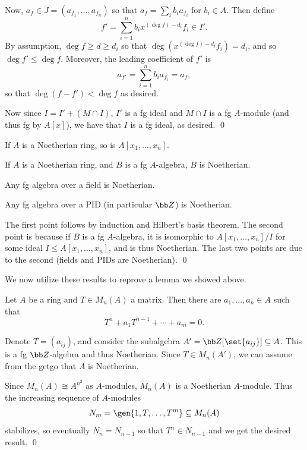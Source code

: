     Now, $a_f\in J=(a_{f_1},\dots,a_{f_n})$ so that $a_f=\sum_ib_ia_{f_i}$ for $b_i\in A$.
    Then define
    $$ f' = \sum_{i=1}^n b_ix^{(\deg f)-d_i}f_i \in I' . $$
    By assumption, $\deg f\geq d\geq d_i$ so that $\deg(x^{(\deg f)-d_i}f_i)=d_i$, and so $\deg f'\leq\deg f$.
    Moreover, the leading coefficient of $f'$ is
    $$ a_{f'} = \sum_{i=1}^n b_ia_{f_i} = a_f, $$
    so that $\deg(f-f')<\deg f$ as desired.

    Now since $I=I'+(M\cap I)$, $I'$ is a fg ideal and $M\cap I$ is a fg $A$-module (and thus fg by $A[x]$), we have that $I$ is a fg ideal, as desired.
    \qed

\eproof

\bcoro

    \benum
        \item If $A$ is a Noetherian ring, so is $A[x_1,\dots,x_n]$.
        \item If $A$ is a Noetherian ring, and $B$ is a fg $A$-algebra, $B$ is Noetherian.
        \item Any fg algebra over a field is Noetherian.
        \item Any fg algebra over a PID (in particular $\bZ$) is Noetherian.
    \eenum

\ecoro

\bproof

    The first point follows by induction and Hilbert's basis theorem.
    The second point is because if $B$ is a fg $A$-algebra, it is isomorphic to $A[x_1,\dots,x_n]/I$ for some ideal $I\leq A[x_1,\dots,x_n]$, and is thus Noetherian.
    The last two points are due to the second (fields and PIDs are Noetherian).
    \qed

\eproof

We now utilize these results to reprove a lemma we showed above.

\blemm

    Let $A$ be a ring and $T\in M_n(A)$ a matrix.
    Then there are $a_1,\dots,a_n\in A$ such that
    $$ T^n + a_1T^{n-1} + \cdots + a_m = 0 . $$

\elemm

\bproof

    Denote $T=(a_{ij})$, and consider the subalgebra $A'=\bZ[\set{a_{ij}}]\subseteq A$.
    This is a fg $\bZ$-algebra and thus Noetherian.
    Since $T\in M_n(A')$, we can assume from the getgo that $A$ is Noetherian.

    Since $M_n(A)\cong A^{n^2}$ as $A$-modules, $M_n(A)$ is a Noetherian $A$-module.
    Thus the increasing sequence of $A$-modules
    $$ N_m = \gen{1,T,\dots,T^m} \subseteq M_n(A) $$
    stabilizes, so eventually $N_n=N_{n-1}$ so that $T^n\in N_{n-1}$ and we get the desired result.
    \qed


